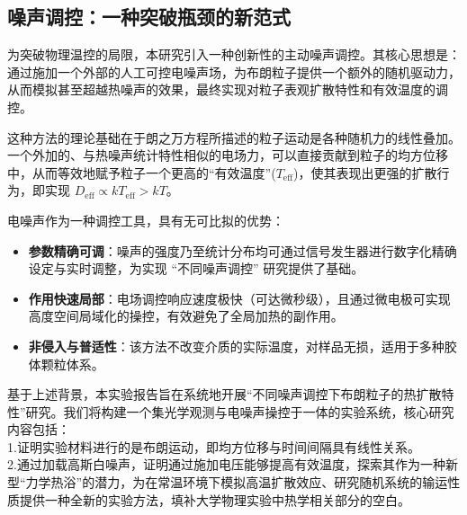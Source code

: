 \documentclass[a4paper]{report} %
\begin{document}
\subsection{噪声调控：一种突破瓶颈的新范式}
为突破物理温控的局限，本研究引入一种创新性的主动噪声调控。其核心思想是：通过施加一个外部的人工可控电噪声场，为布朗粒子提供一个额外的随机驱动力，从而模拟甚至超越热噪声的效果，最终实现对粒子表观扩散特性和有效温度的调控。

这种方法的理论基础在于朗之万方程所描述的粒子运动是各种随机力的线性叠加。一个外加的、与热噪声统计特性相似的电场力，可以直接贡献到粒子的均方位移中，从而等效地赋予粒子一个更高的“有效温度”($T_{\mathrm{eff}}$)，使其表现出更强的扩散行为，即实现 $D_{\mathrm{eff}} \propto kT_{\mathrm{eff}} > kT$。

电噪声作为一种调控工具，具有无可比拟的优势：
\begin{itemize}
  \item \textbf{参数精确可调}：噪声的强度乃至统计分布均可通过信号发生器进行数字化精确设定与实时调整，为实现 “不同噪声调控” 研究提供了基础。
  \item \textbf{作用快速局部}：电场调控响应速度极快（可达微秒级），且通过微电极可实现高度空间局域化的操控，有效避免了全局加热的副作用。
  \item \textbf{非侵入与普适性}：该方法不改变介质的实际温度，对样品无损，适用于多种胶体颗粒体系。
\end{itemize}
基于上述背景，本实验报告旨在系统地开展“不同噪声调控下布朗粒子的热扩散特性”研究。我们将构建一个集光学观测与电噪声操控于一体的实验系统，核心研究内容包括：\\
1.证明实验材料进行的是布朗运动，即均方位移与时间间隔具有线性关系。\\
2.通过加载高斯白噪声，证明通过施加电压能够提高有效温度，探索其作为一种新型“力学热浴”的潜力，为在常温环境下模拟高温扩散效应、研究随机系统的输运性质提供一种全新的实验方法，填补大学物理实验中热学相关部分的空白。
\end{document}
